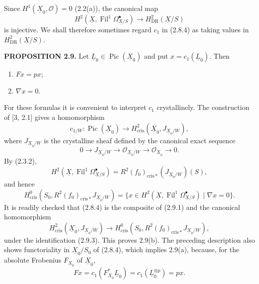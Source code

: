 \documentclass[10pt]{article}
\newcommand{\UX}{\underline{X}}
\newcommand{\UL}{\underline{L}}
\begin{document}
Since $H^1(\UX_0,\mathcal O)=0$ (2.2(a)), the canonical map
\begin{equation}\tag{2.8.6}
H^2(\UX,\operatorname{Fil}^1\Omega^\bullet_{\UX/S})
\longrightarrow H^2_{\mathrm{DR}}(\UX/S)
\end{equation}
is injective. We shall therefore sometimes regard $c_1$ in (2.8.4) as taking values in $H^2_{\mathrm{DR}}(\UX/S)$.

\noindent\textbf{PROPOSITION 2.9.} Let $\UL_0\in\operatorname{Pic}(\UX_0)$ and put $x=c_1(\UL_0)$. Then
\begin{enumerate}[label=\alph*)]
\item $Fx=px$;
\item $\nabla x=0$.
\end{enumerate}

For these formulas it is convenient to interpret $c_1$ crystallinely. The construction of [3, 2.1] gives a homomorphism
\begin{equation}\tag{2.9.1}
c_{1/W}:\operatorname{Pic}(\UX_0)\longrightarrow H^2_{\mathrm{cris}}(\UX_0,J_{\UX_0/W}),
\end{equation}
where $J_{\UX_0/W}$ is the crystalline sheaf defined by the canonical exact sequence
\begin{equation}\tag{2.9.2}
0\longrightarrow J_{\UX_0/W}\longrightarrow\mathcal O_{\UX_0/W}\longrightarrow\mathcal O_{\UX_0}\longrightarrow0.
\end{equation}
By (2.3.2),
\[
H^2(\UX,\operatorname{Fil}^1\Omega^\bullet_{\UX/S})
=R^2(f_0)_{\mathrm{cris}*}(J_{\UX_0/W})(S),
\]
and hence
\begin{equation}\tag{2.9.3}
H^0_{\mathrm{cris}}(S_0,R^2(f_0)_{\mathrm{cris}*}J_{\UX_0/W})
=\{x\in H^2(\UX,\operatorname{Fil}^1\Omega^\bullet_{\UX/S})\mid\nabla x=0\}.
\end{equation}
It is readily checked that (2.8.4) is the composite of (2.9.1) and the canonical homomorphism
\begin{equation}\tag{2.9.4}
H^2_{\mathrm{cris}}(\UX_0,J_{\UX_0/W})\longrightarrow
H^0_{\mathrm{cris}}(S_0,R^2(f_0)_{\mathrm{cris}*}J_{\UX_0/W}),
\end{equation}
under the identification (2.9.3). This proves 2.9(b). The preceding description also shows functoriality in $\UX_0/S_0$ of (2.8.4), which implies 2.9(a), because, for the absolute Frobenius $F_{\UX_0}$ of $\UX_0$,
\[
Fx=c_1(F_{\UX_0}^*\UL_0)=c_1(\UL_0^{\otimes p})=px.
\]
\newpage
\setcounter{footnote}{0}
\fontsize{10.2pt}{12.04pt}\selectfont
\end{document}
